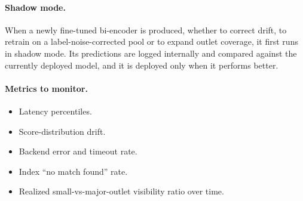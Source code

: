 \documentclass[11pt,letterpaper]{article}
\begin{document}
\paragraph{Shadow mode.}
When a newly fine-tuned bi-encoder is produced, whether to correct drift, to retrain on a label-noise-corrected pool or to expand outlet coverage, it first runs in shadow mode. Its predictions are logged internally and compared against the currently deployed model, and it is deployed only when it performs better.

\paragraph{Metrics to monitor.}
\begin{itemize}
\item Latency percentiles.
\item Score-distribution drift.
\item Backend error and timeout rate.
\item Index ``no match found'' rate.
\item Realized small-vs-major-outlet visibility ratio over time.
\end{itemize}
\end{document}
